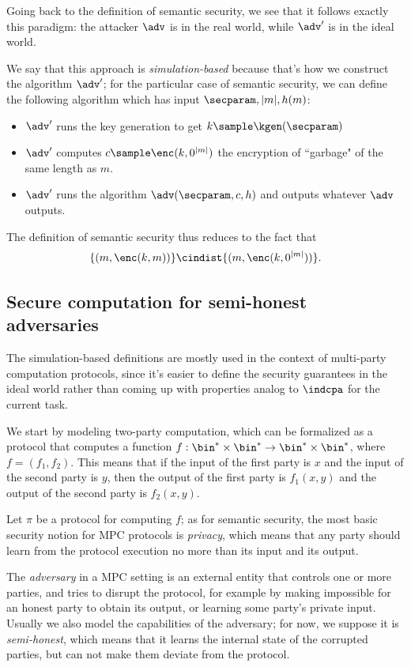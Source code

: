 Going back to the definition of semantic security, we see that it follows exactly this paradigm: the attacker $\adv$ is in the real world, while $\adv'$ is in the ideal world.

We say that this approach is \emph{simulation-based} because that's how we construct the algorithm $\adv'$; for the particular case of semantic security, we can define the following algorithm which has input $\secparam,|m|,h(m)$:
\begin{itemize}
    \item $\adv'$ runs the key generation to get $k\sample\kgen(\secparam)$
    \item $\adv'$ computes $c\sample\enc(k,0^{|m|})$ the encryption of ``garbage" of the same length as $m$.
    \item $\adv'$ runs the algorithm $\adv(\secparam, c, h)$ and outputs whatever $\adv$ outputs.
\end{itemize}

The definition of semantic security thus reduces to the fact that $$\{ (m, \enc(k,m)) \} \cindist \{ (m,\enc(k,0^{|m|})) \}. $$

\subsection{Secure computation for semi-honest adversaries}
The simulation-based definitions are mostly used in the context of multi-party computation protocols, since it's easier to define the security guarantees in the ideal world rather than coming up with properties analog to $\indcpa$ for the current task.

We start by modeling two-party computation, which can be formalized as a protocol that computes a function $f:\bin^\ast\times\bin^\ast \to \bin^\ast\times\bin^\ast$, where $f=(f_1,f_2)$. This means that if the input of the first party is $x$ and the input of the second party is $y$, then the output of the first party is $f_1(x,y)$ and the output of the second party is $f_2(x,y)$.

Let $\pi$ be a protocol for computing $f$; as for semantic security, the most basic security notion for MPC protocols is \emph{privacy}, which means that any party should learn from the protocol execution no more than its input and its output.

The \emph{adversary} in a MPC setting is an external entity that controls one or more parties, and tries to disrupt the protocol, for example by making impossible for an honest party to obtain its output, or learning some party's private input. Usually we also model the capabilities of the adversary; for now, we suppose it is \emph{semi-honest}, which means that it learns the internal state of the corrupted parties, but can not make them deviate from the protocol.

